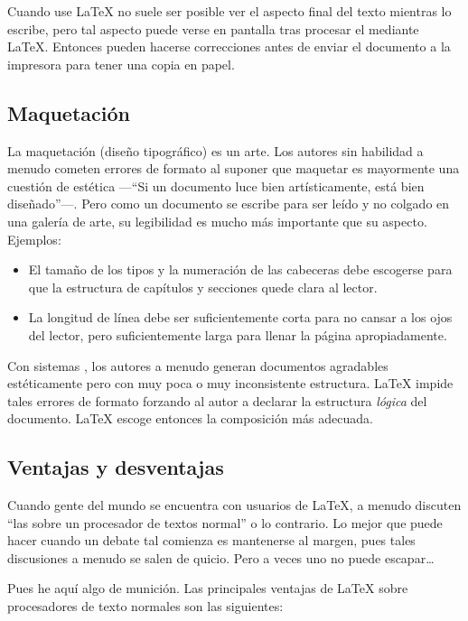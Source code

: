 Cuando use \LaTeX{} no suele ser posible ver el aspecto final del texto mientras lo escribe, pero tal aspecto puede verse en pantalla tras procesar el \filenomo{} mediante \LaTeX.  Entonces pueden hacerse correcciones antes de enviar el documento a la impresora para tener una copia en papel.

\subsection{Maquetación}

La maquetación (diseño tipográfico) es un arte.  Los autores sin habilidad a menudo cometen errores de formato al suponer que maquetar es mayormente una cuestión de estética ---``Si un documento luce bien artísticamente, está bien diseñado''---.  Pero como un documento se escribe para ser leído y no colgado en una galería de arte, su legibilidad es mucho más importante que su aspecto. Ejemplos:
\begin{itemize}
  \item El tamaño de los tipos y la numeración de las cabeceras debe escogerse para que la estructura de capítulos y secciones quede clara al lector.
  \item La longitud de línea debe ser suficientemente corta para no cansar a los ojos del lector, pero suficientemente larga para llenar la página apropiadamente.
\end{itemize}

Con sistemas , los autores a menudo generan documentos agradables estéticamente pero con muy poca o muy inconsistente estructura. \LaTeX{} impide tales errores de formato forzando al autor a declarar la estructura \emph{lógica} del documento. \LaTeX{} escoge entonces la composición más adecuada.

\subsection{Ventajas y desventajas}

Cuando gente del mundo  se encuentra con usuarios de \LaTeX{}, a menudo discuten ``las  sobre un procesador de textos normal'' o lo contrario.  Lo mejor que puede hacer cuando un debate tal comienza es mantenerse al margen, pues tales discusiones a menudo se salen de quicio.  Pero a veces uno no puede escapar\ldots

Pues he aquí algo de munición.  Las principales ventajas de \LaTeX{} sobre procesadores de texto normales son las siguientes:

